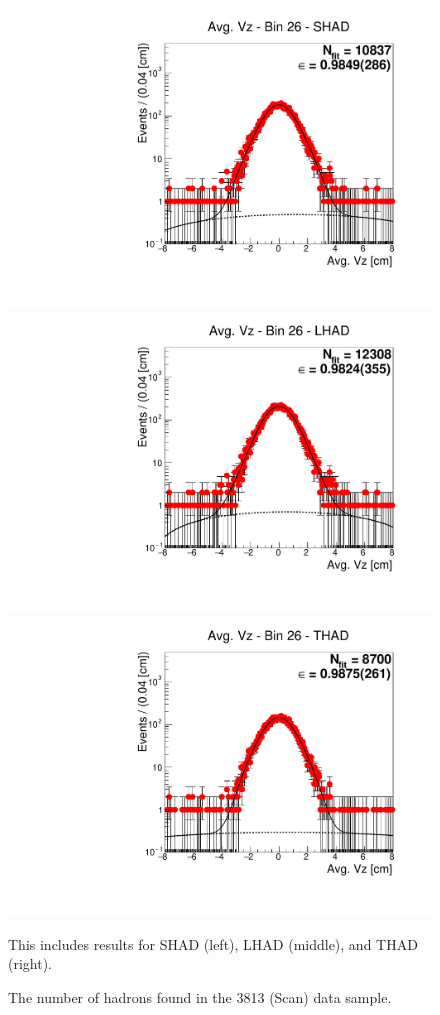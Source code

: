 \begin{figure}[H]
\centering
\includegraphics[scale=0.25]{figures/plots/nonDDbar_fit_results/scan/fit_scan_26_data_SHAD.pdf}
\hspace{-0.5cm}
\includegraphics[scale=0.25]{figures/plots/nonDDbar_fit_results/scan/fit_scan_26_data_LHAD.pdf}
\hspace{-0.5cm}
\includegraphics[scale=0.25]{figures/plots/nonDDbar_fit_results/scan/fit_scan_26_data_THAD.pdf}
\caption{The number of hadrons found in the 3813 (Scan) data sample.}
{This includes results for SHAD (left), LHAD (middle), and THAD (right).}
\label{fig:hadron_fits_scan_26}
\end{figure}

